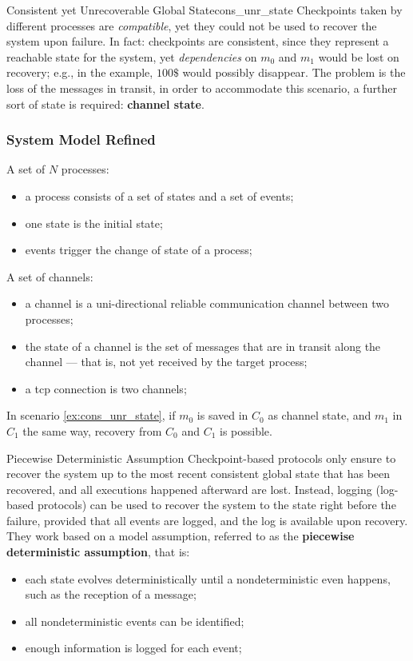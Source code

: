 \documentclass[11pt, a4paper]{article}
\begin{document}
\begin{example}{Consistent yet Unrecoverable Global State}{cons_unr_state}
    Checkpoints taken by different processes are \textit{compatible}, yet they could not be used to recover the system upon failure.
    In fact: checkpoints are consistent, since they represent a reachable state for the system, yet \textit{dependencies} on $m_0$ and $m_1$ would be lost on recovery; e.g., in the example, $100\$$ would possibly disappear.
    The problem is the loss of the messages in transit, in order to accommodate this scenario, a further sort of state is required: \textbf{channel state}.
\end{example}
\subsubsection{System Model Refined}\label{sec:system_model_refined} %
A set of $N$ processes:
\begin{itemize}
    \item a process consists of a set of states and a set of events;
    \item one state is the initial state;
    \item events trigger the change of state of a process;
\end{itemize}
A set of channels:
\begin{itemize}
    \item a channel is a uni-directional reliable communication channel between two processes;
    \item the state of a channel is the set of messages that are in transit along the channel --- that is, not yet received by the target process;
    \item a \ac{tcp} connection is two channels;
\end{itemize}
In scenario \cref{ex:cons_unr_state}, if $m_0$ is saved in $C_0$ as channel state, and $m_1$ in $C_1$ the same way, recovery from $C_0$ and $C_1$ is possible.
\begin{definition}{Piecewise Deterministic Assumption}{}
    Checkpoint-based protocols only ensure to recover the system up to the most recent consistent global state that has been recovered, and all executions happened afterward are lost.
    Instead, logging (log-based protocols) can be used to recover the system to the state right before the failure, provided that all events are logged, and the log is available upon recovery.
    They work based on a model assumption, referred to as the \textbf{piecewise deterministic assumption}, that is:
    \begin{itemize}
        \item each state evolves deterministically until a nondeterministic even happens, such as the reception of a message;
        \item all nondeterministic events can be identified;
        \item enough information is logged for each event;
    \end{itemize}
\end{definition}
\end{document}
